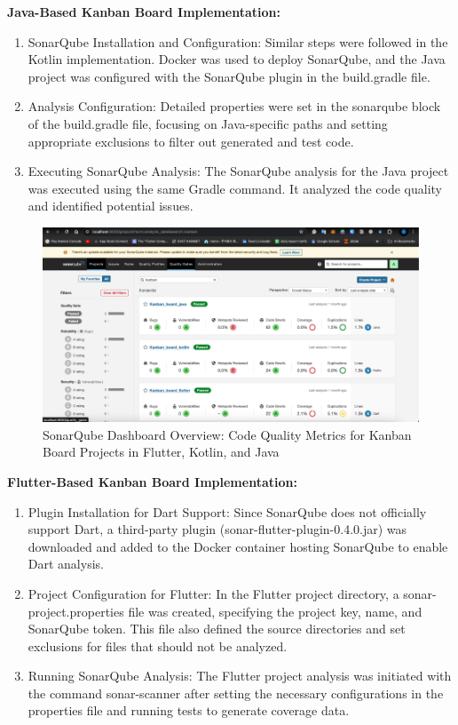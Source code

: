 \textbf{Java-Based Kanban Board Implementation:}
\begin{enumerate}
    \item SonarQube Installation and Configuration: Similar steps were followed in the Kotlin implementation. Docker was used to deploy SonarQube, and the Java project was configured with the SonarQube plugin in the build.gradle file.
    \item Analysis Configuration: Detailed properties were set in the sonarqube block of the build.gradle file, focusing on Java-specific paths and setting appropriate exclusions to filter out generated and test code.
    \item Executing SonarQube Analysis: The SonarQube analysis for the Java project was executed using the same Gradle command. It analyzed the code quality and identified potential issues.
\end{enumerate}
\begin{figure}[htbp]
    \centering
    \includegraphics[scale = 0.8]{img/sonarqube_dashboard.png}
    \caption{SonarQube Dashboard Overview: Code Quality Metrics for Kanban Board Projects in Flutter, Kotlin, and Java}
    \label{fig:sonarqube_dashboard}
\end{figure}
\textbf{Flutter-Based Kanban Board Implementation:}
\begin{enumerate}
    \item Plugin Installation for Dart Support: Since SonarQube does not officially support Dart, a third-party plugin (sonar-flutter-plugin-0.4.0.jar) was downloaded and added to the Docker container hosting SonarQube to enable Dart analysis.
    \item Project Configuration for Flutter: In the Flutter project directory, a sonar-project.properties file was created, specifying the project key, name, and SonarQube token. This file also defined the source directories and set exclusions for files that should not be analyzed.
    \item Running SonarQube Analysis: The Flutter project analysis was initiated with the command sonar-scanner after setting the necessary configurations in the properties file and running tests to generate coverage data.
\end{enumerate}

